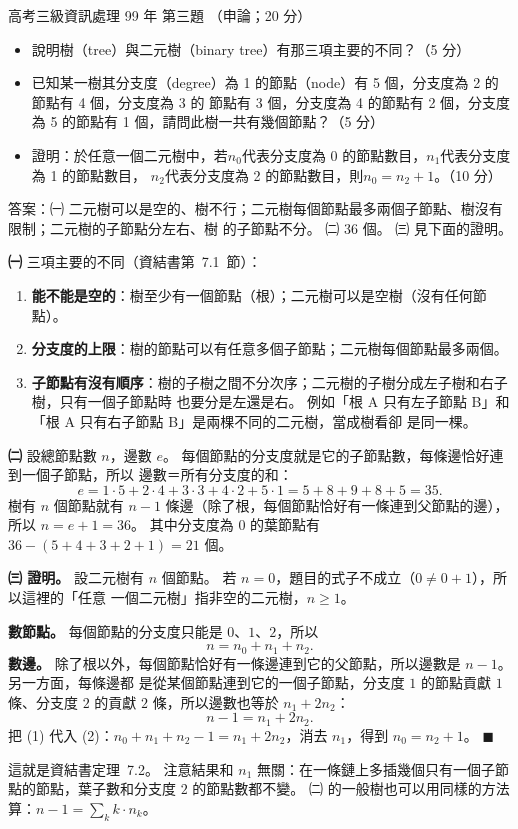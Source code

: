 \begin{pastexam}[label={px:gk3-099-ds-03}]{高考三級資訊處理 99 年 第三題}
（申論；20 分）

\begin{itemize}[leftmargin=2.2em]
\item[㈠] 說明樹（tree）與二元樹（binary tree）有那三項主要的不同？（5 分）
\item[㈡] 已知某一樹其分支度（degree）為 1 的節點（node）有 5 個，分支度為 2 的節點有 4 個，分支度為 3 的
節點有 3 個，分支度為 4 的節點有 2 個，分支度為 5 的節點有 1 個，請問此樹一共有幾個節點？（5 分）
\item[㈢] 證明：於任意一個二元樹中，若$n_0$代表分支度為 0 的節點數目，$n_1$代表分支度為 1 的節點數目，
$n_2$代表分支度為 2 的節點數目，則$n_0 = n_2 + 1$。（10 分）
\end{itemize}
\end{pastexam}

\begin{pastsoln}
答案：㈠ 二元樹可以是空的、樹不行；二元樹每個節點最多兩個子節點、樹沒有限制；二元樹的子節點分左右、樹
的子節點不分。 ㈡ $36$ 個。 ㈢ 見下面的證明。

\textbf{㈠} 三項主要的不同（資結書第~7.1~節）：
\begin{enumerate}
\item \textbf{能不能是空的}：樹至少有一個節點（根）；二元樹可以是空樹（沒有任何節點）。
\item \textbf{分支度的上限}：樹的節點可以有任意多個子節點；二元樹每個節點最多兩個。
\item \textbf{子節點有沒有順序}：樹的子樹之間不分次序；二元樹的子樹分成左子樹和右子樹，只有一個子節點時
也要分是左還是右。 例如「根 A 只有左子節點 B」和「根 A 只有右子節點 B」是兩棵不同的二元樹，當成樹看卻
是同一棵。
\end{enumerate}

\textbf{㈡} 設總節點數 $n$，邊數 $e$。 每個節點的分支度就是它的子節點數，每條邊恰好連到一個子節點，所以
邊數＝所有分支度的和：
\[
e = 1 \cdot 5 + 2 \cdot 4 + 3 \cdot 3 + 4 \cdot 2 + 5 \cdot 1 = 5 + 8 + 9 + 8 + 5 = 35.
\]
樹有 $n$ 個節點就有 $n - 1$ 條邊（除了根，每個節點恰好有一條連到父節點的邊），所以 $n = e + 1 = 36$。
其中分支度為 $0$ 的葉節點有 $36 - (5 + 4 + 3 + 2 + 1) = 21$ 個。

\textbf{㈢ 證明。} 設二元樹有 $n$ 個節點。 若 $n = 0$，題目的式子不成立（$0 \ne 0 + 1$），所以這裡的「任意
一個二元樹」指非空的二元樹，$n \ge 1$。

\textbf{數節點。} 每個節點的分支度只能是 $0$、$1$、$2$，所以
\[
n = n_0 + n_1 + n_2. \tag{1}
\]
\textbf{數邊。} 除了根以外，每個節點恰好有一條邊連到它的父節點，所以邊數是 $n - 1$。 另一方面，每條邊都
是從某個節點連到它的一個子節點，分支度 $1$ 的節點貢獻 $1$ 條、分支度 $2$ 的貢獻 $2$ 條，所以邊數也等於
$n_1 + 2n_2$：
\[
n - 1 = n_1 + 2n_2. \tag{2}
\]
把 (1) 代入 (2)：$n_0 + n_1 + n_2 - 1 = n_1 + 2n_2$，消去 $n_1$，得到 $n_0 = n_2 + 1$。 \hfill$\blacksquare$

這就是資結書定理~7.2。 注意結果和 $n_1$ 無關：在一條鏈上多插幾個只有一個子節點的節點，葉子數和分支度 $2$
的節點數都不變。 ㈡ 的一般樹也可以用同樣的方法算：$n - 1 = \sum_k k \cdot n_k$。
\end{pastsoln}
